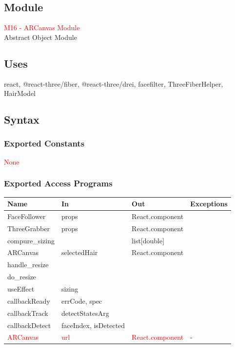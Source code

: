 \documentclass[12pt, titlepage]{article}
\begin{document}
\subsection{Module}
\textcolor{red}{M16 - ARCanvas Module}\\
Abstract Object Module

\subsection{Uses}
react, @react-three/fiber, @react-three/drei, facefilter, ThreeFiberHelper, HairModel

\subsection{Syntax}

\subsubsection{Exported Constants}
\textcolor{red}{None}

\subsubsection{Exported Access Programs}
\begin{center}
\begin{tabular}{p{4cm} p{3cm} p{4cm} p{4cm}}
\hline
\textbf{Name} & \textbf{In} & \textbf{Out} & \textbf{Exceptions} \\
\hline
FaceFollower & props & React.component\\
ThreeGrabber  & props & React.component\\
compure\_sizing & & list[double] \\
ARCanvas & selectedHair & React.component\\
handle\_resize & & \\
do\_resize  & & \\
useEffect & sizing & \\
callbackReady & errCode, spec &\\
callbackTrack & detectStatesArg & \\
callbackDetect & faceIndex, isDetected & \\
\textcolor{red}{ARCanvas} & \textcolor{red}{url} & \textcolor{red}{React.component} &  -\\
\hline
\end{tabular}
\end{center}
\end{document}
